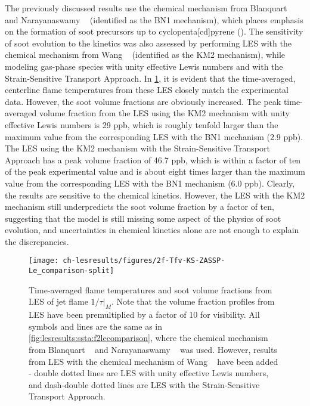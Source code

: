 The previously discussed results use the chemical mechanism from Blanquart \etal~\cite{blanquart2009} and Narayanaswamy \etal~\cite{narayanaswamy2010} (identified as the BN1 mechanism), which places emphasis on the formation of soot precursors up to cyclopenta[cd]pyrene (). The sensitivity of soot evolution to the kinetics was also assessed by performing LES with the chemical mechanism from Wang \etal~\cite{wang2013} (identified as the KM2 mechanism), while modeling gas-phase species with unity effective Lewis numbers and with the Strain-Sensitive Transport Approach. In \cref{fig:lesresults:ssta:f2lemechcomparison}, it is evident that the time-averaged, centerline flame temperatures from these LES closely match the experimental data. However, the soot volume fractions are obviously increased. The peak time-averaged volume fraction from the LES using the KM2 mechanism with unity effective Lewis numbers is 29 ppb, which is roughly tenfold larger than the maximum value from the corresponding LES with the BN1 mechanism (2.9 ppb). The LES using the KM2 mechanism with the Strain-Sensitive Transport Approach has a peak volume fraction of 46.7 ppb, which is within a factor of ten of the peak experimental value and is about eight times larger than the maximum value from the corresponding LES with the BN1 mechanism (6.0 ppb). Clearly, the results are sensitive to the chemical kinetics. However, the LES with the KM2 mechanism still underpredicts the soot volume fraction by a factor of ten, suggesting that the model is still missing some aspect of the physics of soot evolution, and uncertainties in chemical kinetics alone are not enough to explain the discrepancies. %

\begin{figure}[htb]
  \centering
  \texttt{[image: ch-lesresults/figures/2f-Tfv-KS-ZASSP-Le\_comparison-split]}
  \caption[Centerline \texorpdfstring{$\langle T \rangle$}{<T>} \& \texorpdfstring{$\langle f_V \rangle$}{<fV>} from LES of Flame \texorpdfstring{$1/\tau|_M$}{1/t|M} with Various Transport Approaches and Chemical Mechanisms]{Time-averaged flame temperatures and soot volume fractions from LES of jet flame $1/\tau|_M$. Note that the volume fraction profiles from LES have been premultiplied by a factor of 10 for visibility. All symbols and lines are the same as in \cref{fig:lesresults:ssta:f2lecomparison}, where the chemical mechanism from Blanquart \etal~\cite{blanquart2009} and Narayanaswamy \etal~\cite{narayanaswamy2010} was used. However, results from LES with the chemical mechanism of Wang \etal~\cite{wang2013} have been added - double dotted lines are LES with unity effective Lewis numbers, and dash-double dotted lines are LES with the Strain-Sensitive Transport Approach.}
  \label{fig:lesresults:ssta:f2lemechcomparison}
\end{figure}

